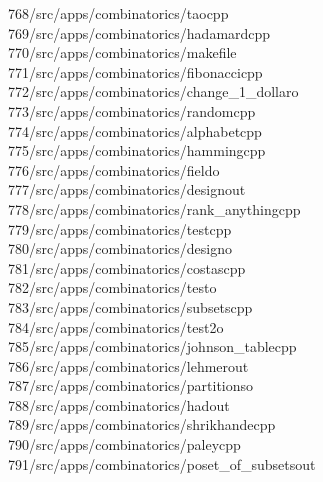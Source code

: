 \begin{tabbing}
768\>/src/apps/combinatorics/taocpp\\[0pt]
769\>/src/apps/combinatorics/hadamardcpp\\[0pt]
770\>/src/apps/combinatorics/makefile\\[0pt]
771\>/src/apps/combinatorics/fibonaccicpp\\[0pt]
772\>/src/apps/combinatorics/change\_1\_dollaro\\[0pt]
773\>/src/apps/combinatorics/randomcpp\\[0pt]
774\>/src/apps/combinatorics/alphabetcpp\\[0pt]
775\>/src/apps/combinatorics/hammingcpp\\[0pt]
776\>/src/apps/combinatorics/fieldo\\[0pt]
777\>/src/apps/combinatorics/designout\\[0pt]
778\>/src/apps/combinatorics/rank\_anythingcpp\\[0pt]
779\>/src/apps/combinatorics/testcpp\\[0pt]
780\>/src/apps/combinatorics/designo\\[0pt]
781\>/src/apps/combinatorics/costascpp\\[0pt]
782\>/src/apps/combinatorics/testo\\[0pt]
783\>/src/apps/combinatorics/subsetscpp\\[0pt]
784\>/src/apps/combinatorics/test2o\\[0pt]
785\>/src/apps/combinatorics/johnson\_tablecpp\\[0pt]
786\>/src/apps/combinatorics/lehmerout\\[0pt]
787\>/src/apps/combinatorics/partitionso\\[0pt]
788\>/src/apps/combinatorics/hadout\\[0pt]
789\>/src/apps/combinatorics/shrikhandecpp\\[0pt]
790\>/src/apps/combinatorics/paleycpp\\[0pt]
791\>/src/apps/combinatorics/poset\_of\_subsetsout\\[0pt]

\end{tabbing}
